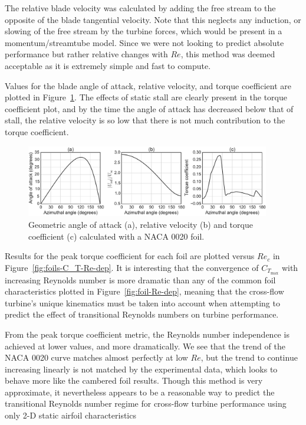 \documentclass[energies,article,accept,moreauthors,pdftex,12pt,a4paper]{mdpi}
\begin{document}
The relative blade velocity was calculated by adding the free stream to the
opposite of the blade tangential velocity. Note that this neglects any
induction, or slowing of the free stream by the turbine forces, which would be
present in a momentum/streamtube model. Since we were not looking to predict
absolute performance but rather relative changes with $Re$, this method was
deemed acceptable as it is extremely simple and fast to compute. 

Values for the blade angle of attack, relative velocity, and torque coefficient
are plotted in Figure~\ref{fig:blade-kinematics}. The effects of static stall
are clearly present in the torque coefficient plot, and by the time the angle of
attack has decreased below that of stall, the relative velocity is so low that
there is not much contribution to the torque coefficient.

\begin{figure}[ht!]
\centering
\includegraphics[width=0.95\textwidth]{figures/foil_kinematics_ct}
\caption{Geometric angle of attack (a), relative velocity (b) and torque coefficient
(c) calculated with a NACA 0020 foil.}
\label{fig:blade-kinematics}
\end{figure}

Results for the peak torque coefficient for each foil are plotted versus $Re_c$
in Figure~\ref{fig:foils-C_T-Re-dep}. It is interesting that the convergence of
$C_{T_\mathrm{max}}$ with increasing Reynolds number is more dramatic than any of the
common foil characteristics plotted in Figure~\ref{fig:foil-Re-dep}, meaning
that the cross-flow turbine's unique kinematics must be taken into account when
attempting to predict the effect of transitional Reynolds numbers on turbine
performance. 

From the peak torque coefficient metric, the Reynolds number independence is
achieved at lower values, and more dramatically. We see that the trend of the
NACA 0020 curve matches almost perfectly at low $Re$, but the trend to continue
increasing linearly is not matched by the experimental data, which looks to
behave more like the cambered foil results. Though this method is very
approximate, it nevertheless appears to be a reasonable way to predict the
transitional Reynolds number regime for cross-flow turbine performance using
only 2-D static airfoil characteristics
\end{document}
